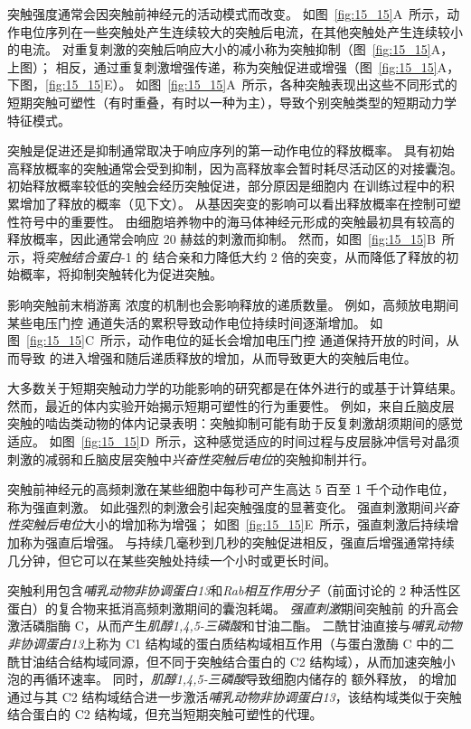 突触强度通常会因突触前神经元的活动模式而改变。
如图~\ref{fig:15_15}A~所示，动作电位序列在一些突触处产生连续较大的突触后电流，在其他突触处产生连续较小的电流。
对重复刺激的突触后响应大小的减小称为突触抑制（图~\ref{fig:15_15}A，上图）；
相反，通过重复刺激增强传递，称为突触促进或增强（图~\ref{fig:15_15}A，下图，\ref{fig:15_15}E）。
如图~\ref{fig:15_15}A~所示，各种突触表现出这些不同形式的短期突触可塑性（有时重叠，有时以一种为主），导致个别突触类型的短期动力学特征模式。


突触是促进还是抑制通常取决于响应序列的第一动作电位的释放概率。
具有初始高释放概率的突触通常会受到抑制，因为高释放率会暂时耗尽活动区的对接囊泡。
初始释放概率较低的突触会经历突触促进，部分原因是细胞内  在训练过程中的积累增加了释放的概率（见下文）。
从基因突变的影响可以看出释放概率在控制可塑性符号中的重要性。
由细胞培养物中的海马体神经元形成的突触最初具有较高的释放概率，因此通常会响应 20 赫兹的刺激而抑制。
然而，如图~\ref{fig:15_15}B~所示，将\textit{突触结合蛋白}-1 的  结合亲和力降低大约 2 倍的突变，从而降低了释放的初始概率，将抑制突触转化为促进突触。


影响突触前末梢游离  浓度的机制也会影响释放的递质数量。
例如，高频放电期间某些电压门控  通道失活的累积导致动作电位持续时间逐渐增加。
如图~\ref{fig:15_15}C~所示，动作电位的延长会增加电压门控  通道保持开放的时间，从而导致  的进入增强和随后递质释放的增加，从而导致更大的突触后电位。


大多数关于短期突触动力学的功能影响的研究都是在体外进行的或基于计算结果。
然而，最近的体内实验开始揭示短期可塑性的行为重要性。
例如，来自丘脑皮层突触的啮齿类动物的体内记录表明：突触抑制可能有助于反复刺激胡须期间的感觉适应。
如图~\ref{fig:15_15}D~所示，这种感觉适应的时间过程与皮层脉冲信号对晶须刺激的减弱和丘脑皮层突触中\textit{兴奋性突触后电位}的突触抑制并行。


突触前神经元的高频刺激在某些细胞中每秒可产生高达 5 百至 1 千个动作电位，称为强直刺激。
如此强烈的刺激会引起突触强度的显著变化。
强直刺激期间\textit{兴奋性突触后电位}大小的增加称为增强；
如图~\ref{fig:15_15}E~所示，强直刺激后持续增加称为强直后增强。
与持续几毫秒到几秒的突触促进相反，强直后增强通常持续几分钟，但它可以在某些突触处持续一个小时或更长时间。


突触利用包含\textit{哺乳动物非协调蛋白13}和\textit{Rab相互作用分子}（前面讨论的 2 种活性区蛋白）的复合物来抵消高频刺激期间的囊泡耗竭。
\textit{强直刺激}期间突触前  的升高会激活磷脂酶 C，从而产生\textit{肌醇1,4,5-三磷酸}和甘油二酯。
二酰甘油直接与\textit{哺乳动物非协调蛋白13}上称为 C1 结构域的蛋白质结构域相互作用（与蛋白激酶 C 中的二酰甘油结合结构域同源，但不同于突触结合蛋白的 C2 结构域），从而加速突触小泡的再循环速率。
同时，\textit{肌醇1,4,5-三磷酸}导致细胞内储存的  额外释放， 的增加通过与其 C2 结构域结合进一步激活\textit{哺乳动物非协调蛋白13}，该结构域类似于突触结合蛋白的 C2 结构域，但充当短期突触可塑性的代理。



